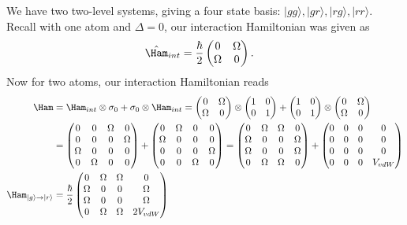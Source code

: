 \documentclass[a4paper, 11pt, normalem]{report}
\begin{document}
We have two two-level systems, giving a four state basis: $|gg\rangle,|gr\rangle,|rg\rangle,|rr\rangle$.
Recall with one atom and $\Delta=0$, our interaction Hamiltonian was given as
\begin{align}
    \hat{\Ham}_{int} &= \frac{\hbar}{2}\begin{pmatrix} 0 & \Omega \\ \Omega & 0\end{pmatrix}.
\end{align}
Now for two atoms, our interaction Hamiltonian reads
\begin{align}
    \Ham &= \Ham_{int}\otimes\sigma_0 + \sigma_0\otimes\Ham_{int} = \begin{pmatrix}0 & \Omega \\ \Omega & 0\end{pmatrix}\otimes\begin{pmatrix}1&0\\0&1\end{pmatrix} + \begin{pmatrix}1&0\\0&1\end{pmatrix} \otimes\begin{pmatrix}0&\Omega\\\Omega&0\end{pmatrix} \\
         &= \begin{pmatrix} 0&0&\Omega&0\\0&0&0&\Omega\\\Omega&0&0&0\\0&\Omega&0&0\end{pmatrix} + \begin{pmatrix} 0&\Omega&0&0\\\Omega&0&0&0\\0&0&0&\Omega\\0&0&\Omega&0\end{pmatrix} = \begin{pmatrix} 0&\Omega&\Omega&0\\\Omega&0&0&\Omega\\\Omega&0&0&\Omega\\0&\Omega&\Omega&0\end{pmatrix} + \begin{pmatrix}0&0&0&0\\0&0&0&0\\0&0&0&0\\0&0&0&V_{vdW}\end{pmatrix} \\
    \Ham_{|g\rangle\to|r\rangle} &= \frac{\hbar}{2}\begin{pmatrix} 0&\Omega&\Omega&0\\\Omega&0&0&\Omega\\\Omega&0&0&\Omega\\0&\Omega&\Omega&2V_{vdW}\end{pmatrix}
\end{align}
\end{document}
